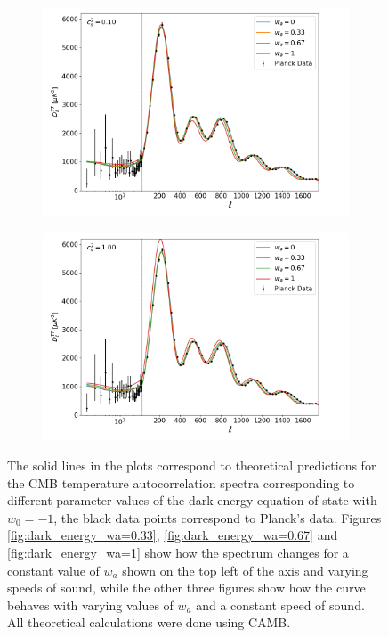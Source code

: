 \documentclass[openany,a4paper,12pt,oneside]{book}
\begin{document}
\begin{spacing}{1.5}
\begin{figure}
{\begin{subfigure}[t]{.43\paperwidth}
		\includegraphics[width=\linewidth]{Imagens/full_doublscale_Cs2fixo0.10.png}
		\caption{}
		\label{fig:dark_energy_cs2=0.1}
	\end{subfigure}
	\hfill
	\begin{subfigure}[t]{.43\paperwidth}
		\centering
		\includegraphics[width=\linewidth]{Imagens/full_doublscale_Cs2fixo1.00.png}
		\caption{}
		\label{fig:dark_energy_cs2=1}
	\end{subfigure}
}
\caption{The solid lines in the plots correspond to theoretical predictions for the CMB temperature autocorrelation spectra corresponding to different parameter values of the dark energy equation of state with $w_0=-1$, the black data points correspond to Planck's data\cite{Planck_results}. Figures \ref{fig:dark_energy_wa=0.33}, \ref{fig:dark_energy_wa=0.67} and \ref{fig:dark_energy_wa=1} show how the spectrum changes for a constant value of $w_a$ shown on the top left of the axis and varying speeds of sound, while the other three figures show how the curve behaves with varying values of $w_a$ and a constant speed of sound. All theoretical calculations were done using CAMB.}
\label{fig:Dark_energy_tests}
\end{figure}


\end{spacing}
\end{document}
